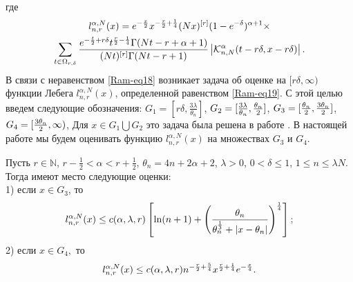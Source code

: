 где
\begin{multline}\label{Ram-eq19}
l_{n,r}^{\alpha,N}(x)=e^{-{x\over 2}}x^{-{r\over 2}+{1\over 4}}(Nx)^{[r]}(1-e^{-\delta})^{\alpha+1}\times\\
\sum_{t\in\Omega_{r,\delta}}{e^{-{t\over 2}+r\delta}t^{{r\over 2}-{1\over 4}}\Gamma(Nt-r+\alpha+1)\over(Nt)^{[r]}\Gamma(Nt-r+1)}
\left|\mathcal{K}_{n,N}^\alpha(t-r\delta,x-r\delta)\right|.
\end{multline}
В связи с неравенством \eqref{Ram-eq18} возникает задача об оценке на $[r\delta, \infty)$ функции Лебега $l_{n,r}^{\alpha,N}(x)$, определенной равенством \eqref{Ram-eq19}. С этой целью введем следующие обозначения:
$G_1=[r\delta,\frac{3\lambda}{\theta_n}]$, $G_2=[\frac{3\lambda}{\theta_n},{\theta_n\over 2}]$,
$G_3=[\frac{\theta_n}{2},{3\theta_n\over 2}]$,
$G_4=[{3\theta_n\over 2}, \infty)$,
Для $x\in G_1\bigcup G_2$ это задача была решена в работе \cite{RamVMJ}.
В настоящей работе мы будем оценивать функцию $l_{n,r}^{\alpha,N}(x)$ на множествах $G_3$ и $G_4$.

\begin{theorem}\label{Ramtheo2}
Пусть $r\in\mathbb{N}$, $r-\frac{1}{2}<\alpha< r+\frac{1}{2}$, $\theta_n=4n+2\alpha+2$, $\lambda>0$, $0<\delta\leq1$, $1\leq n\leq\lambda N.$ Тогда имеют место следующие оценки:\\
1) если $x\in G_3$, то
\begin{equation*}
l_{n,r}^{\alpha,N}(x)\leq c(\alpha,\lambda,r)\left[\ln(n+1)+
\left(\frac{\theta_n}{\theta_n^{1\over3}+|x-\theta_n|}
\right)^{\frac{1}{4}}\right];
\end{equation*}
2) если $x\in G_4,$ то
\begin{equation*}
l_{n,r}^{\alpha,N}(x)\leq c(\alpha,\lambda,r)n^{-{r\over 2}+{5\over 4}}
x^{{r\over 2}+{1\over 4}}e^{-\frac{x}{4}}.
\end{equation*}
\end{theorem} 